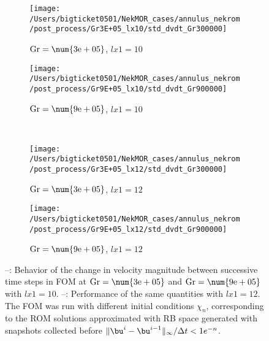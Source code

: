 \begin{figure}[!h]
     \centering
     \begin{subfigure}[b]{0.45\textwidth}
         \centering
         \texttt{[image: /Users/bigticket0501/NekMOR\_cases/annulus\_nekrom/post\_process/Gr3E+05\_lx10/std\_dvdt\_Gr300000]}
         \caption{$\rm Gr=\num{3e+05}$, $lx1=10$}
         \label{fig:2_a}
     \end{subfigure}
     \hfill
     \begin{subfigure}[b]{0.45\textwidth}
         \centering
         \texttt{[image: /Users/bigticket0501/NekMOR\_cases/annulus\_nekrom/post\_process/Gr9E+05\_lx10/std\_dvdt\_Gr900000]}
         \caption{$\rm Gr=\num{9e+05}$, $lx1=10$}
         \label{fig:2_b}
     \end{subfigure}\\
     \begin{subfigure}[b]{0.45\textwidth}
         \centering
         \texttt{[image: /Users/bigticket0501/NekMOR\_cases/annulus\_nekrom/post\_process/Gr3E+05\_lx12/std\_dvdt\_Gr300000]}
         \caption{$\rm Gr=\num{3e+05}$, $lx1=12$}
         \label{fig:2_c}
     \end{subfigure}
     \hfill
     \begin{subfigure}[b]{0.45\textwidth}
         \centering
         \texttt{[image: /Users/bigticket0501/NekMOR\_cases/annulus\_nekrom/post\_process/Gr9E+05\_lx12/std\_dvdt\_Gr900000]}
         \caption{$\rm Gr=\num{9e+05}$, $lx1=12$}
         \label{fig:2_d}
     \end{subfigure}
     \caption{
     --: Behavior of the change in velocity magnitude
     between successive time steps in FOM at $\rm Gr=\num{3e+05}$ and $\rm
     Gr=\num{9e+05}$ with $lx1=10$.
     --: Performance of the same quantities
     with $lx1=12$.  The FOM was run with different initial conditions
     $\chi_n$, corresponding to the ROM solutions approximated with RB space
     generated with snapshots collected before
     $\|\bu^i-\bu^{i-1}\|_{\infty}/\Delta t < 1e^{-n}$.} \label{fig:2}
\end{figure}

